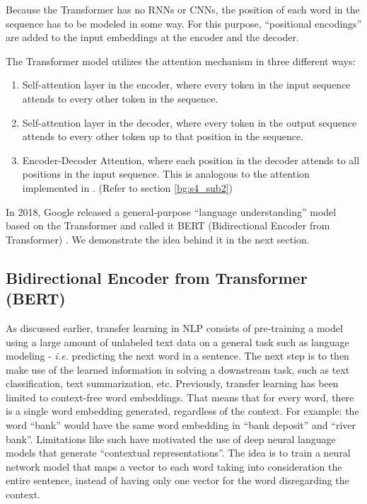 Because the Transformer has no \ac{RNN}s or \ac{CNN}s, the position of each word in the sequence has to be modeled in some way. For this purpose, \enquote{positional encodings} \cite{gehring2017convolutional} \cite{vaswani2017attention} are added to the input embeddings at the encoder and the decoder.


The Transformer model utilizes the attention mechanism in three different ways:
\begin{enumerate}
	\item Self-attention layer in the encoder, where every token in the input sequence attends to every other token in the sequence.
	\item Self-attention layer in the decoder, where every token in the output sequence attends to every other token up to that position in the sequence.
	\item Encoder-Decoder Attention, where each position in the decoder attends to all positions in the input sequence. This is analogous to the attention implemented in \cite{bahdanau2014neural}. (Refer to section \ref{bg:s4_sub2})
\end{enumerate}


In 2018, Google released a general-purpose \enquote{language understanding} model based on the Transformer and called it \ac{BERT} (Bidirectional Encoder from Transformer) \cite{devlin2018bert}. We demonstrate the idea behind it in the next section.

\subsection{Bidirectional Encoder from Transformer (BERT)} 
\label{bg:s4_sub4}

As discussed earlier, transfer learning in \ac{NLP} consists of pre-training a model using a large amount of unlabeled text data on a general task such as language modeling - \textit{i.e.} predicting the next word in a sentence. The next step is to then make use of the learned information in solving a downstream task, such as text classification, text summarization, etc. Previously, transfer learning has been limited to context-free word embeddings. That means that for every word, there is a single word embedding generated, regardless of the context. For example: the word \enquote{bank} would have the same word embedding in \enquote{bank deposit} and \enquote{river bank}. Limitations like such have motivated the use of deep neural language models that generate \enquote{contextual representations}. The idea is to train a neural network model that maps a vector to each word taking into consideration the entire sentence, instead of having only one vector for the word disregarding the context.

